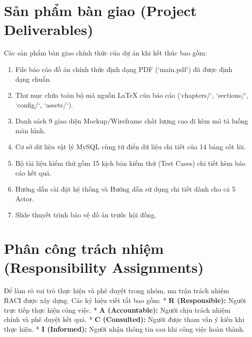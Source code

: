 \section{Sản phẩm bàn giao (Project Deliverables)}
\label{sec:spmp_deliverables}

Các sản phẩm bàn giao chính thức của dự án khi kết thúc bao gồm:
\begin{enumerate}
    \item File báo cáo đồ án chính thức định dạng PDF (`main.pdf`) đã được định dạng chuẩn.
    \item Thư mục chứa toàn bộ mã nguồn LaTeX của báo cáo (`chapters/`, `sections/`, `config/`, `assets/`).
    \item Danh sách 9 giao diện Mockup/Wireframe chất lượng cao đi kèm mô tả luồng màn hình.
    \item Cơ sở dữ liệu vật lý MySQL cùng từ điển dữ liệu chi tiết của 14 bảng cốt lõi.
    \item Bộ tài liệu kiểm thử gồm 15 kịch bản kiểm thử (Test Cases) chi tiết kèm báo cáo kết quả.
    \item Hướng dẫn cài đặt hệ thống và Hướng dẫn sử dụng chi tiết dành cho cả 5 Actor.
    \item Slide thuyết trình bảo vệ đồ án trước hội đồng.
\end{enumerate}

\section{Phân công trách nhiệm (Responsibility Assignments)}
\label{sec:spmp_responsibility}

Để làm rõ vai trò thực hiện và phê duyệt trong nhóm, ma trận trách nhiệm RACI được xây dựng. Các ký hiệu viết tắt bao gồm:
* \textbf{R (Responsible):} Người trực tiếp thực hiện công việc.
* \textbf{A (Accountable):} Người chịu trách nhiệm chính và phê duyệt kết quả.
* \textbf{C (Consulted):} Người được tham vấn ý kiến khi thực hiện.
* \textbf{I (Informed):} Người nhận thông tin sau khi công việc hoàn thành.

